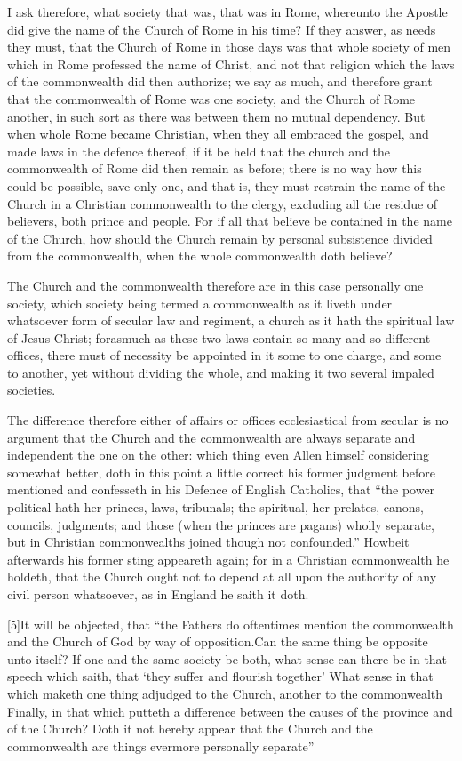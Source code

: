 I ask therefore, what society that was, that was in Rome, whereunto the Apostle did give the name of the Church of Rome in his time? If they answer, as needs they must, that the Church of Rome in those days was that whole society of men which in Rome professed the name of Christ, and not that religion which the laws of the commonwealth did then authorize; we say as much, and therefore grant that the commonwealth of Rome was one society, and the Church of  Rome another, in such sort as there was between them no mutual dependency. But when whole Rome became Christian, when they all embraced the gospel, and made laws in the defence thereof, if it be held that the church and the commonwealth of Rome did then remain as before; there is no way how this could be possible, save only one, and that is, they must restrain the name of the Church in a Christian commonwealth to the clergy, excluding all the residue of believers, both prince and people. For if all that believe be contained in the name of the Church, how should the Church remain by personal subsistence divided from the commonwealth, when the whole commonwealth doth believe?

The Church and the commonwealth therefore are in this case personally one society, which society being termed a commonwealth as it liveth under whatsoever form of secular law and regiment, a church as it hath the spiritual law of Jesus Christ; forasmuch as these two laws contain so many and so different offices, there must of necessity be appointed in it some to one charge, and some to another, yet without dividing the whole, and making it two several impaled societies.

The difference therefore either of affairs or offices ecclesiastical from secular is no argument that the Church and the commonwealth are always separate and independent the one on the other: which thing even Allen himself considering somewhat better, doth in this point a little correct his former judgment before mentioned and confesseth in his  Defence of English Catholics, that “the power political hath her princes, laws, tribunals; the spiritual, her prelates, canons, councils, judgments; and those (when the princes are pagans) wholly separate, but in Christian commonwealths joined though not confounded.” Howbeit afterwards his former sting appeareth again; for in a Christian commonwealth he holdeth, that the Church ought not to depend at all upon the authority of any civil person whatsoever, as in England he saith it doth.

[5]It will be objected, that “the Fathers do oftentimes mention the commonwealth and the Church of God by way of opposition.Can the same thing be opposite unto itself? If one and the same society be both, what sense can there be in that speech which saith, that ‘they suffer and flourish together’ What sense in that which maketh one thing adjudged to the Church, another to the commonwealth Finally, in that which putteth a difference between the causes of the province and of the Church? Doth it not hereby appear that the Church and the commonwealth are things evermore personally separate”

